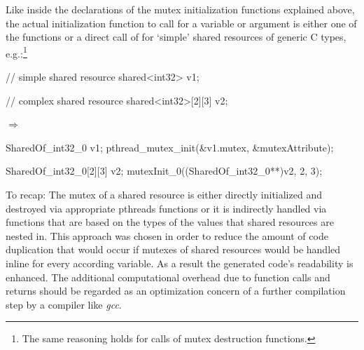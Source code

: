 Like inside the declarations of the mutex initialization functions explained above, the actual initialization function to call for a variable or argument is either one of the  functions or a direct call of  for `simple' shared resources of generic C types, e.g.:\footnote{The same reasoning holds for calls of mutex destruction functions.}

\vspace{4mm}
\begin{minipage}{1\textwidth}
\begin{center}
\begin{minipage}{0.3\textwidth}
\begin{ccode}{}
// simple shared resource
shared<int32> v1;

// complex shared resource
shared<int32>[2][3] v2;
\end{ccode}
\end{minipage}
\qquad$\Longrightarrow$\qquad\qquad
\begin{minipage}{0.5\textwidth}
\begin{ccode}{}
SharedOf_int32_0 v1;
pthread_mutex_init(&v1.mutex, &mutexAttribute);

SharedOf_int32_0[2][3] v2;
mutexInit_0((SharedOf_int32_0**)v2, 2, 3);
\end{ccode}
\end{minipage}
\end{center}
\end{minipage}
\vspace{4mm}

To recap: The mutex of a shared resource is either directly initialized and destroyed via appropriate pthreads functions or it is indirectly handled via functions that are based on the types of the values that shared resources are nested in. This approach was chosen in order to reduce the amount of code duplication that would occur if mutexes of shared resources would be handled inline for every according variable. As a result the generated code's readability is enhanced. The additional computational overhead due to function calls and returns should be regarded as an optimization concern of a further compilation step by a compiler like \textit{gcc}.


